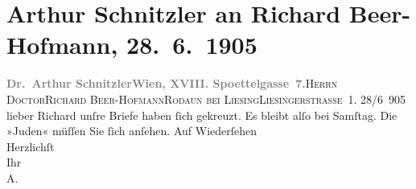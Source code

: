 

         
         \renewcommand{\erwaehntePersonen}{Personen: Richard Beer-Hofmann}
         \renewcommand{\erwaehnteOrte}{Orte: Edmund-Weiß-Gasse 7, IX., Alsergrund, Liesingerstraße, Rodaun, Wien}
         \renewcommand{\erwaehnteWerke}{Werke: Die Juden. Schauspiel in drei Aufzügen}
               \section[Arthur Schnitzler an Richard Beer-Hofmann, 28. 6. 1905]{ Arthur Schnitzler an Richard Beer-Hofmann, 28. 6. 1905}\nopagebreak{}\rehead{ }\begin{ledgroupsized}[t]{13cm}\normalsize\beginnumbering \toendnotes[C]{\smallbreak\pagebreak[2]} 
\pstart{}{\pb}\textcolor{gray}{\textbf{Dr. Arthur Schnitzler}}\pend{}\pstart{}\textcolor{gray}{\textbf{Wien, XVIII. Spoettelgasse 7.}}\pend{}{\bigskip}\pstart{}{\pb}\textsc{Herrn Doctor}\pend{}\pstart{}\textsc{Richard Beer-Hofmann}\pend{}\pstart{}\textsc{Rodaun bei Liesing}\pend{}\pstart{}\textsc{Liesingerstraße 1}.\pend{}{\bigskip}\pstart
           \raggedleft{}{\pb}28/6 905\pend
           \pstart{}lieber Richard\pend\pstart
           unſre Briefe haben ſich gekreuzt. Es bleibt alſo bei Samſtag.\pend
           \pstart
           Die »Juden« müſſen Sie ſich anſehen.\pend
           \pstart
           {\pb}Auf Wiederſehen{\\}Herzlichſt{\\}Ihr{\\}\spacefill\mbox{A.}\pend
           
         
         \endnumbering{}\end{ledgroupsized}  \newcommand{\dateiname}{L01529}\newcommand{\titel}{Arthur Schnitzler an Richard Beer-Hofmann, 28. 6. 1905}\newcommand{\editorInnen}{Martin Anton Müller und Gerd-Hermann Susen}
      